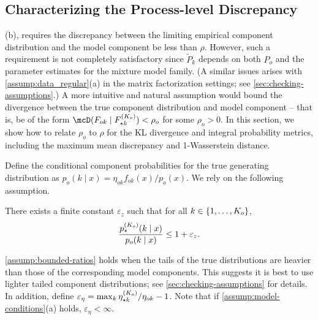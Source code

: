 \subsection{Characterizing the Process-level Discrepancy}
\label{subsec:theory-rho-bounds}

(b), requires the discrepancy between the limiting empirical component distribution and the model component
be less than $\rho$. %
However, such a requirement is not completely satisfactory since $\widetilde{P}_{k}$ depends on both $P_{o}$ and the parameter
estimates for the mixture model family.
(A similar issues arises with \cref{assump:data_regular}(a) in the matrix factorization settings; see \cref{sec:checking-assumptions}.)
A more intuitive and natural assumption would bound the divergence between the true component distribution and model component -- that is, be of the
form $\mcD(F_{ok} \mid F_{\star k}^{(\numcomps_{o})}) < \rho_o$ for some $\rho_{o} > 0$.
In this section, we show how to relate $\rho_o$ to $\rho$ for the KL divergence and integral probability metrics, including the maximum mean discrepancy and 1-Wasserstein distance.

Define the conditional component probabilities for the true generating distribution as
\(
p_{o}(k \mid x) = {\eta_{ok}f_{ok}(x)}/{p_{o}(x)}.
\)
We rely on the following assumption.
\begin{assumption} \label{assump:bounded-ratios}
	There exists a finite constant $\varepsilon_{z}$ such that for all $k \in \{1,\ldots, K_{o}\}$,
	\[
		\frac{p_{\star}^{(K_{o})}(k \mid x)}{p_{o}(k \mid x)} \le 1 + \varepsilon_{z}.
	\]
\end{assumption}
\cref{assump:bounded-ratios} holds when the tails of the true distributions are heavier than those of the corresponding model components.
This suggests it is best to use lighter tailed component distributions; see \cref{sec:checking-assumptions} for details.
In addition, define $\varepsilon_{\eta} = \max_{k} {\eta_{\star k}^{(K_{o})}}/{\eta_{ok}} - 1$.
Note that if \cref{assump:model-conditions}(a) holds, $\varepsilon_{\eta} < \infty$.

